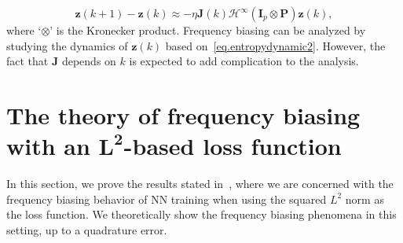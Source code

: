 {\begin{equation}\label{eq.entropydynamic2}
    \mathbf{z}(k+1) - \mathbf{z}(k) \approx -\eta\mathbf{J}(k) \boldsymbol{\mathcal{H}}^\infty (\mathbf{I}_p \otimes \mathbf{P}) \mathbf{z}(k),
\end{equation}
where `$\otimes$' is the Kronecker product. Frequency biasing can be analyzed by studying the dynamics of $\mathbf{z}(k)$ based on~\cref{eq.entropydynamic2}. However, the fact that $\mathbf{J}$ depends on $k$ is expected to add complication to the analysis.
}


\section{The theory of frequency biasing with an $\mathbf{L^2}$-based loss function}\label{sec:L2_proof}
In this section, we prove the results stated in~, where we are concerned with the frequency biasing behavior of NN training when using the squared $L^2$ norm as the loss function. We theoretically show the frequency biasing phenomena in this setting, up to a quadrature error.




